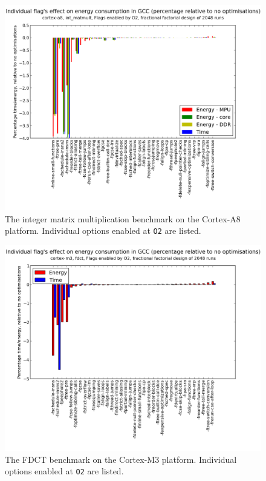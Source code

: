 \documentclass[twocolumn]{article}
\begin{document}
\begin{figure}[tb]
	\includegraphics[width=\linewidth]{cortex-a8/O2_main_effects_int_matmult.png}
	\caption{The integer matrix multiplication benchmark on the Cortex-A8 platform. Individual options enabled at \texttt{O2} are listed.}
	\label{Fig:IntMatmultO2MainEffects}
\end{figure}

\begin{figure}[tb]
	\includegraphics[width=\linewidth]{cortex-m3/O2_main_effects_fdct.png}
	\caption{The FDCT benchmark on the Cortex-M3 platform. Individual options enabled at \texttt{O2} are listed.}
	\label{Fig:FdctO2MainEffects}
\end{figure}
\end{document}
